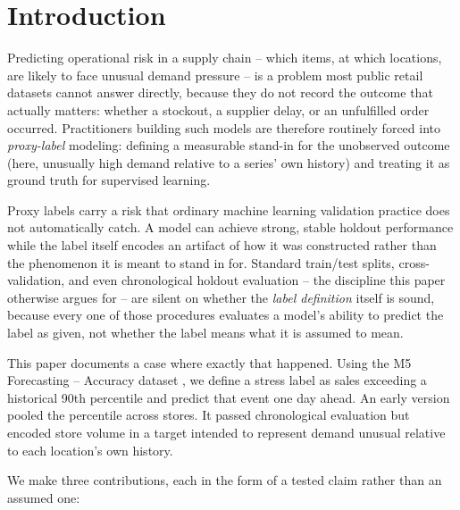 \documentclass[11pt]{article}
\begin{document}
\section{Introduction}

Predicting operational risk in a supply chain -- which items, at which locations, are likely to face unusual demand pressure -- is a problem most public retail datasets cannot answer directly, because they do not record the outcome that actually matters: whether a stockout, a supplier delay, or an unfulfilled order occurred. Practitioners building such models are therefore routinely forced into \emph{proxy-label} modeling: defining a measurable stand-in for the unobserved outcome (here, unusually high demand relative to a series' own history) and treating it as ground truth for supervised learning.

Proxy labels carry a risk that ordinary machine learning validation practice does not automatically catch. A model can achieve strong, stable holdout performance while the label itself encodes an artifact of how it was constructed rather than the phenomenon it is meant to stand in for. Standard train/test splits, cross-validation, and even chronological holdout evaluation -- the discipline this paper otherwise argues for -- are silent on whether the \emph{label definition} itself is sound, because every one of those procedures evaluates a model's ability to predict the label as given, not whether the label means what it is assumed to mean.

This paper documents a case where exactly that happened. Using the M5 Forecasting -- Accuracy dataset \citep{makridakis2022m5}, we define a stress label as sales exceeding a historical 90th percentile and predict that event one day ahead. An early version pooled the percentile across stores. It passed chronological evaluation but encoded store volume in a target intended to represent demand unusual relative to each location's own history.

We make three contributions, each in the form of a tested claim rather than an assumed one:
\end{document}

